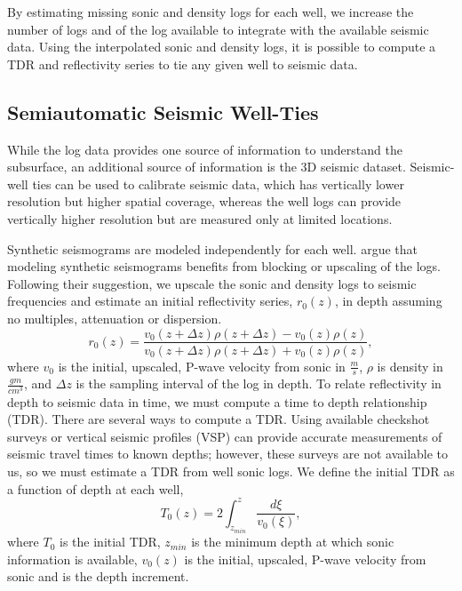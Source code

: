 By estimating missing sonic and density logs for each well, we increase the number of logs and  of the log available to integrate with the available seismic data. Using the interpolated sonic and density logs, it is possible to compute a TDR and reflectivity series to tie any given well to seismic data.

\subsection{Semiautomatic Seismic Well-Ties}
While the log data provides one source of information to understand the subsurface, an additional source of information is the 3D seismic dataset. Seismic-well ties can be used to calibrate seismic data, which has vertically lower resolution but higher spatial coverage, whereas the well logs can provide vertically higher resolution but are measured only at limited locations.

Synthetic seismograms are modeled independently for each well. \cite{whitesimm2003} argue that modeling synthetic seismograms benefits from blocking or upscaling of the logs. Following their suggestion, we upscale the sonic and density logs to seismic frequencies \cite[]{backus1962long, marion1994scale} and estimate an initial reflectivity series, $r_0(z)$, in depth assuming no multiples, attenuation or dispersion.
\begin{equation} \label{eq:rpp}
r_0(z) = \frac{v_0(z + \Delta z)\rho(z + \Delta z) - v_0(z)\rho(z)}{v_0(z + \Delta z)\rho(z + \Delta z) + v_0(z)\rho(z)},
\end{equation}
where $v_0$ is the initial, upscaled, P-wave velocity from sonic in $\frac{m}{s}$, $\rho$ is density in $\frac{gm}{cm^3}$, and $\Delta z$ is the sampling interval of the log in depth. To relate reflectivity in depth to seismic data in time, we must compute a time to depth relationship (TDR). There are several ways to compute a TDR. Using available checkshot surveys or vertical seismic profiles (VSP) can provide accurate measurements of seismic travel times to known depths; however, these surveys are not available to us, so we must estimate a TDR from well sonic logs. We define the initial TDR as a function of depth at each well,
\begin{equation} \label{eq:tdr}
T_0(z) = 2 \int_{z_{min}}^{z} \frac{d\xi}{v_0(\xi)},
\end{equation}
where $T_0$ is the initial TDR, $z_{min}$ is the minimum depth at which sonic information is available, $v_0(z)$ is the initial, upscaled, P-wave velocity from sonic and  is the depth increment.

